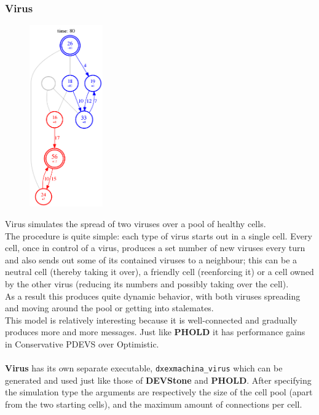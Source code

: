 \documentclass[8pt,a4paper]{report}
\begin{document}
\subsubsection{Virus}
\begin{figure}
  \begin{center}
    \includegraphics[width=0.28\textwidth]{virus}
  \end{center}
\end{figure}

Virus simulates the spread of two viruses over a pool of healthy cells.\\

The procedure is quite simple: each type of virus starts out in a single cell. Every cell, once in control of a virus, produces a set number of new viruses every turn and also sends out some of its contained viruses to a neighbour; this can be a neutral cell (thereby taking it over), a friendly cell (reenforcing it) or a cell owned by the other virus (reducing its numbers and possibly taking over the cell).\\
As a result this produces quite dynamic behavior, with both viruses spreading and moving around the pool or getting into stalemates.\\

This model is relatively interesting because it is well-connected and gradually produces more and more messages. Just like \textbf{PHOLD} it has performance gains in Conservative PDEVS over Optimistic.\\
\\
\textbf{Virus} has its own separate executable, \texttt{dxexmachina\_virus} which can be generated and used just like those of \textbf{DEVStone} and \textbf{PHOLD}. After specifying the simulation type the arguments are respectively the size of the cell pool (apart from the two starting cells), and the maximum amount of connections per cell.
\end{document}
